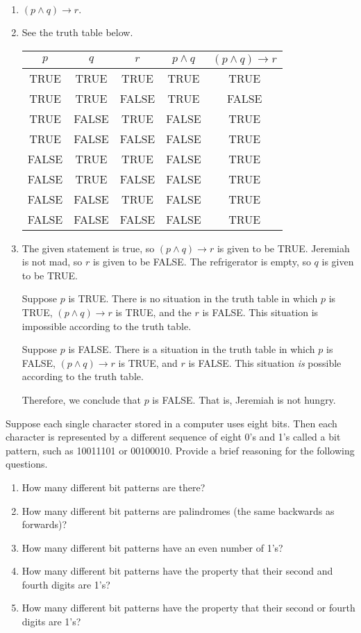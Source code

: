 \documentclass{article}
\theoremstyle{definition}
\begin{document}
\begin{solution}\begin{enumerate}
    \item$(p\land q)\rightarrow r.$
    \item See the truth table below.
    
\begin{center}\begin{tabular}{c|c|c||c||c}
$p$&$q$&$r$&$p\land q$&$(p\land q)\rightarrow r$\\\hline
TRUE&TRUE&TRUE&TRUE&TRUE\\
TRUE&TRUE&FALSE&TRUE&FALSE\\
TRUE&FALSE&TRUE&FALSE&TRUE\\
TRUE&FALSE&FALSE&FALSE&TRUE\\
FALSE&TRUE&TRUE&FALSE&TRUE\\
FALSE&TRUE&FALSE&FALSE&TRUE\\
FALSE&FALSE&TRUE&FALSE&TRUE\\
FALSE&FALSE&FALSE&FALSE&TRUE\\
\end{tabular}\end{center}
\item The given statement is true, so $(p\land q)\rightarrow r$ is given to be TRUE. Jeremiah is not mad, so $r$ is given to be FALSE. The refrigerator is empty, so $q$ is given to be TRUE.

Suppose $p$ is TRUE. There is no situation in the truth table in which $p$ is TRUE, $(p\land q)\rightarrow r$ is TRUE, and the $r$ is FALSE. This situation is impossible according to the truth table.

Suppose $p$ is FALSE. There is a situation in the truth table in which $p$ is FALSE, $(p\land q)\rightarrow r$ is TRUE, and $r$ is FALSE. This situation \textit{is} possible according to the truth table.

Therefore, we conclude that $p$ is FALSE. That is, Jeremiah is not hungry.

\end{enumerate}\end{solution}
\begin{question}
    Suppose each single character stored in a computer uses eight bits. 
    Then each character is represented by a different sequence of eight 0's and 1's called a bit pattern, 
    such as 10011101 or 00100010. Provide a brief reasoning for the following questions.
        \begin{enumerate}
            \item How many different bit patterns are there?
            \item How many different bit patterns are palindromes (the same backwards as forwards)?
            \item How many different bit patterns have an even number of 1's?
            \item How many different bit patterns have the property that their second and fourth digits are 1's?
            \item How many different bit patterns have the property that their second or fourth digits are 1's?
        \end{enumerate}
\end{question}
\end{document}
